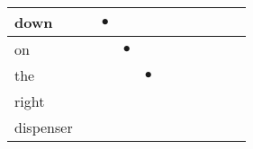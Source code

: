 \documentclass[landscape]{article}
\newcommand{\ssp}{\hspace{2pt}}
\newcommand{\mex}{\cellcolor{g}$\bullet$}
\begin{document}
\begin{tabular}{|l|p{10pt}|p{10pt}|p{10pt}|p{10pt}|p{10pt}|p{10pt}|p{10pt}|p{10pt}|p{10pt}|p{10pt}|}
\hline
\ssp \cellcolor{ref1}down \ssp&\hspace{2pt}&\hspace{2pt}\mex&\hspace{2pt}&\hspace{2pt}&\hspace{2pt}&\hspace{2pt}&\hspace{2pt}&\hspace{2pt}&\hspace{2pt}&\hspace{2pt}\\
\hline
\ssp \cellcolor{ref2}on \ssp&\hspace{2pt}&\hspace{2pt}&\hspace{2pt}\mex&\hspace{2pt}&\hspace{2pt}&\hspace{2pt}&\hspace{2pt}&\hspace{2pt}&\hspace{2pt}&\hspace{2pt}\\
\hline
\ssp \cellcolor{ref3}the \ssp&\hspace{2pt}&\hspace{2pt}&\hspace{2pt}&\hspace{2pt}\mex&\hspace{2pt}&\hspace{2pt}&\hspace{2pt}&\hspace{2pt}&\hspace{2pt}&\hspace{2pt}\\
\hline
\ssp right \ssp&\hspace{2pt}&\hspace{2pt}&\hspace{2pt}&\hspace{2pt}&\hspace{2pt}&\hspace{2pt}&\hspace{2pt}&\hspace{2pt}&\hspace{2pt}&\hspace{2pt}\\
\hline
\ssp dispenser \ssp&\hspace{2pt}&\hspace{2pt}&\hspace{2pt}&\hspace{2pt}&\hspace{2pt}&\hspace{2pt}&\hspace{2pt}&\hspace{2pt}&\hspace{2pt}&\hspace{2pt}\\

\end{tabular}
\end{document}
